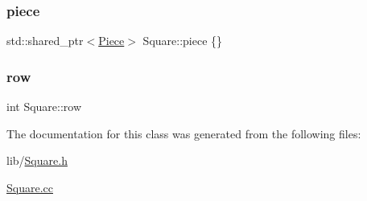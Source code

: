 \mbox{\label{class_square_aa3ea4ebade8191d5d1a1b23855b4e434}} 
\subsubsection{\texorpdfstring{piece}{piece}}
{\footnotesize\ttfamily std\+::shared\+\_\+ptr$<$\hyperlink{class_piece}{Piece}$>$ Square\+::piece \{\}\hspace{0.3cm}{\ttfamily [private]}}

\mbox{\label{class_square_aa353950a9ef437401db55ae605b0f8b9}} 
\subsubsection{\texorpdfstring{row}{row}}
{\footnotesize\ttfamily int Square\+::row\hspace{0.3cm}{\ttfamily [private]}}



The documentation for this class was generated from the following files\+:\begin{DoxyCompactItemize}
\item 
lib/\hyperlink{_square_8h}{Square.\+h}\item 
\hyperlink{_square_8cc}{Square.\+cc}\end{DoxyCompactItemize}
